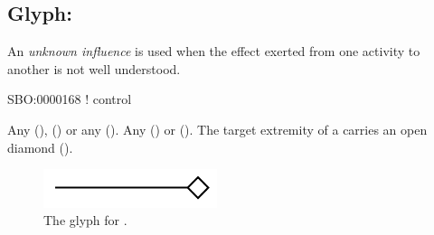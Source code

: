 \subsection{Glyph: }
\label{sec:af:unknown_infl}

An \emph{unknown influence} is used when the effect exerted from one activity to another is not well understood.

\begin{glyphDescription}

\glyphSboTerm SBO:0000168 ! control

 \glyphOrigin Any  (),   () or any  ().
 \glyphTarget Any  () or  ().
 \glyphEndPoint The target extremity of a  carries an open diamond ().

\end{glyphDescription}

\begin{figure}[H]
  \centering
  \includegraphics[width = 2in]{images/unknownInfluence}
  \caption{The \AF glyph for .}
  \label{fig:af:unknownInfl}
\end{figure}

